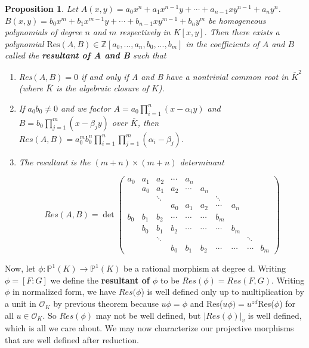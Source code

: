 \documentclass[12pt]{amsart}
\newtheorem{prop}[thm]{Proposition}
\theoremstyle{definition}
\theoremstyle{remark}
\theoremstyle{definition}
\newcommand{\MCO}{\mathcal{O}}
\newcommand{\ol}{\overline}
\begin{document}
\begin{prop}
 Let $A(x,y)=a_0x^n+a_1x^{n-1}y+\cdots + a_{n-1}xy^{n-1}+a_ny^n$. 
 $B(x,y)=b_0x^m+b_1x^{m-1}y+\cdots +b_{n-1}xy^{m-1}+b_ny^m$ be homogeneous polynomials of degree $n$ and $m$ respectively in $K[x,y]$. Then there exists a polynomial $\text{Res}(A,B) \in \mathbb{Z}[a_0,...,a_n,b_0,...,b_m]$ in the coefficients of $A$ and $B$ called the \textbf{resultant of A and B} such that 
\begin{enumerate}
\item Res$(A,B)=0$ if and only if A and B have a nontrivial common root in $\overline{K}^2$ (where $\ol{K}$ is the algebraic closure of $K$). 
\item If $a_0b_0 \neq 0$ and we factor $A=a_0 \prod_{i=1}^n(x-\alpha_iy)$ and $B=b_0\prod_{j=1}^m (x - \beta_jy)$ over $\ol{K}$, then $Res(A,B) = a_0^{m}b_0^{n}\prod_{i=1}^n\prod_{j=1}^m(\alpha_i - \beta_j)$. 
 
\item The resultant is the $(m+n) \times (m+n)$ determinant
 
 \[
Res(A,B) = \det \begin{pmatrix}
a_0 & a_1 & a_2 & \cdots & a_n & & & \\
    & a_0 & a_1 & a_2 & \cdots & a_n\\
    &     & \ddots &    &      &  & \ddots\\      
    &   &  & a_0 & a_1 & a_2 & \cdots & a_n\\
b_0 & b_1 & b_2 & \cdots &\cdots & \cdots & b_m\\
    & b_0 & b_1 & b_2 & \cdots &\cdots & \cdots & b_m\\
    &&\ddots &&&&&& \ddots\\
    &&&b_0 & b_1 & b_2 & \cdots &\cdots & \cdots & b_m 
\end{pmatrix}
\]

 \end{enumerate} 
 \end{prop}




 
 Now, let $\phi : \mathbb{P}^1(K) \rightarrow \mathbb{P}^1(K)$ be a rational morphism at degree d. Writing $\phi =[F:G]$ we define the \textbf{resultant of $\phi$} to be $Res(\phi)=Res(F,G)$. Writing $\phi$ in normalized form, we have $Res(\phi$) is well defined only up to multiplication by a unit in $\MCO_K$ by previous theorem because $u\phi=\phi$ and Res($u\phi)=u^{zd}$Res($\phi$) for all $u \in \MCO_K$. So $Res(\phi)$ may not be well defined, but $|Res(\phi)|_v$ is well defined, which is all we care about. We may now characterize our projective morphisms that are well defined after reduction. 
 
\end{document}
